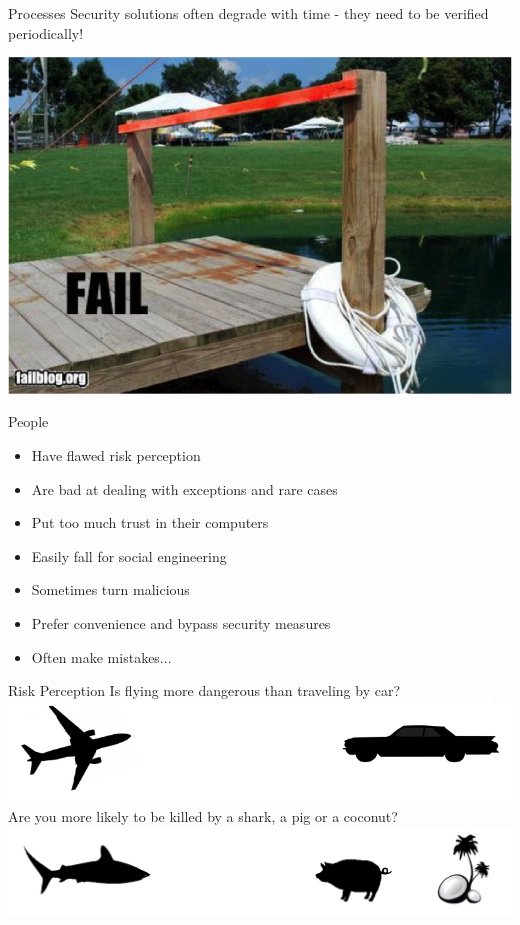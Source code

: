 \documentclass{beamer}
\begin{document}
\begin{frame}{Processes}
Security solutions often degrade with time - they need to be verified periodically!
\begin{center}
\includegraphics[width=0.7\linewidth]{process2.png} 
\end{center}
\end{frame}

\begin{frame}{People}
	\begin{itemize}
		\item Have flawed risk perception
		\item Are bad at dealing with exceptions and rare cases
        \item Put too much trust in their computers
        \item Easily fall for social engineering
        \item Sometimes turn malicious
        \item Prefer convenience and bypass security measures
        \item Often make mistakes...
	\end{itemize}
\end{frame}

\begin{frame}{Risk Perception}
Is flying more dangerous than traveling by car?
\newline
\includegraphics[width=0.8\linewidth]{planecar.png}
\newline 
Are you more likely to be killed by a shark, a pig or a coconut?
\newline
\includegraphics[width=0.8\linewidth]{sharkpigcoco.png}
\end{frame}
\end{document}
